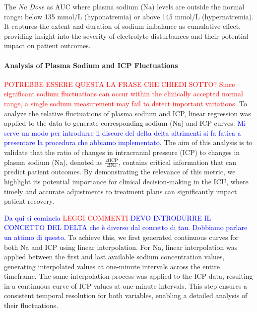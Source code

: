 The \textit{Na Dose} as AUC where plasma sodium (Na) levels are outside the normal range: below 135 mmol/L (hyponatremia) or above 145 mmol/L (hypernatremia). It captures the extent and duration of sodium imbalance as cumulative effect, providing insight into the severity of electrolyte disturbances and their potential impact on patient outcomes.  

\paragraph{Analysis of Plasma Sodium and ICP Fluctuations}
\textcolor{red}{POTREBBE ESSERE QUESTA LA FRASE CHE CHIEDI SOTTO? Since significant sodium fluctuations can occur within the clinically accepted normal range, a single sodium measurement may fail to detect  important variations.}
To analyze the relative fluctuations of plasma sodium and ICP, linear regression was applied to the data to generate corresponding sodium (Na) and ICP curves.
\textcolor{blue}{Mi serve un modo per introdurre il discore del delta delta altrimenti si fa fatica a presentare la procedura che abbiamo implementato}.
The aim of this analysis is to validate that the ratio of changes in intracranial pressure (ICP) to changes in plasma sodium (Na), denoted as \(\frac{\Delta \text{ICP}}{\Delta \text{Na}}\), contains critical information that can predict patient outcomes. By demonstrating the relevance of this metric, we highlight its potential importance for clinical decision-making in the ICU, where timely and accurate adjustments to treatment plans can significantly impact patient recovery.

\textcolor{blue}{Da qui si comincia} \textcolor{red}{LEGGI COMMENTI}
\textcolor{blue}{DEVO INTRODURRE IL CONCETTO DEL DELTA che è diverso dal concetto di tau. Dobbiamo parlare un attimo di questo. }
To achieve this, we first generated continuous curves for both Na and ICP using linear interpolation. For Na, linear interpolation was applied between the first and last available sodium concentration values, generating interpolated values at one-minute intervals across the entire timeframe. The same interpolation process was applied to the ICP data, resulting in a continuous curve of ICP values at one-minute intervals. This step ensures a consistent temporal resolution for both variables, enabling a detailed analysis of their fluctuations.

